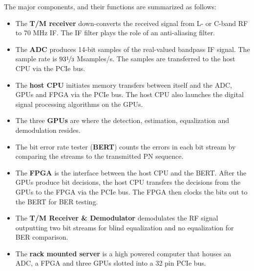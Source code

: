 The major components, and their functions are summarized as follows:
\begin{itemize}
	\item The \textbf{T/M receiver} down-converts the received signal from L- or C-band RF to 70 MHz IF.
	The IF filter plays the role of an anti-aliasing filter.
	\item The \textbf{ADC} produces 14-bit samples of the real-valued bandpass IF signal.
	The sample rate is $93\nicefrac{1}{3}$ Msamples/s.
	The samples are transferred to the host CPU via the PCIe bus.
	\item The \textbf{host CPU} initiates memory transfers between itself and the ADC, GPUs and FPGA via the PCIe 	bus. 
	The host CPU also launches the digital signal processing algorithms on the GPUs.
	\item The three \textbf{GPUs} are where the detection, estimation, equalization and demodulation resides.
	\item The bit error rate tester (\textbf{BERT}) counts the errors in each bit stream by comparing the 		streams to the transmitted PN sequence.
	\item The \textbf{FPGA} is the interface between the host CPU and the BERT. After the GPUs produce bit decisions, the host CPU transfers the decisions from the GPUs to the FPGA via the PCIe bus. The FPGA then clocks the bits out to the BERT for BER testing.
	\item The \textbf{T/M Receiver \& Demodulator} demodulates the RF signal outputting two bit streams for blind equalization and no equalization for BER comparison.
	\item The \textbf{rack mounted server} is a high powered computer that houses an ADC, a FPGA and three GPUs 			slotted into a 32 pin PCIe bus.
\end{itemize}

